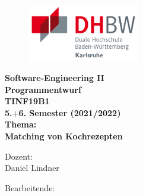 \thispagestyle{empty}
\begin{titlepage}
\enlargethispage{4cm}

\begin{figure}           %
	\begin{minipage}{0.49\textwidth}
		\flushleft
	\end{minipage}
	\hfill
	\begin{minipage}{0.49\textwidth}
		\flushright
		\includegraphics[height=2.5cm]{Bilder/Logos/Logo_DHBW.pdf} 
	\end{minipage}
\end{figure} 
\vspace*{0.1cm}

\begin{center}
	\huge{\textbf{Software-Engineering II}}\\[1.5cm]
	\Large{\textbf{Programmentwurf}}\\
	\Large{\textbf{TINF19B1}}\\
	\Large{\textbf{5.$+$6. Semester (2021/2022)}}\\[1cm]
	\Large{\textbf{Thema:}}\\
	\Large{\textbf{Matching von Kochrezepten}}\\[2cm]
\end{center}

\begin{center}
	\normalsize{Dozent:}\\
	\large{Daniel Lindner}
\end{center}

\begin{center}
	\normalsize{Bearbeitende:}\\
	\Large{\bearbeitende}
\end{center}
\end{titlepage}
